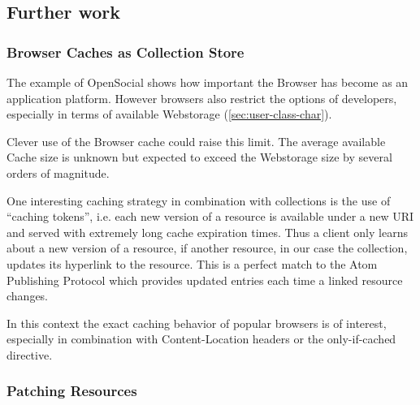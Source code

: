 \documentclass[12pt,a4paper,twoside]{scrartcl}		%
\begin{document}



\subsection{Further work}
\label{sec:further-work}



\subsubsection{Browser Caches as Collection Store}
\label{sec:browser-caches-as}

The example of OpenSocial shows how important the Browser has become as an
application platform. However browsers also restrict the options of developers,
especially in terms of available Webstorage (\autoref{sec:user-class-char}).

Clever use of the Browser cache could raise this limit. The average available
Cache size is unknown but expected to exceed the Webstorage size by several
orders of magnitude.

One interesting caching strategy in combination with collections is the use of
``caching tokens'', i.e. each new version of a resource is available under a new
URI and served with extremely long cache expiration times. Thus a client only
learns about a new version of a resource, if another resource, in our case the
collection, updates its hyperlink to the resource. This is a perfect match to
the Atom Publishing Protocol which provides updated entries each time a linked
resource changes.

In this context the exact caching behavior of popular browsers is of interest,
especially in combination with Content-Location headers or the only-if-cached
directive.

\subsubsection{Patching Resources}
\label{sec:patching-resources}
\end{document}
